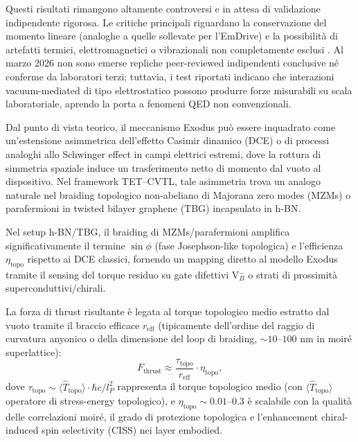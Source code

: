 \documentclass[11pt,a4paper]{article}
\let\oldcite\cite
\renewcommand{\cite}{\protect\oldcite}
\theoremstyle{plain}
\theoremstyle{definition}
\begin{document}
Questi risultati rimangono altamente controversi e in attesa di validazione indipendente rigorosa. Le critiche principali riguardano la conservazione del momento lineare (analoghe a quelle sollevate per l'EmDrive) e la possibilità di artefatti termici, elettromagnetici o vibrazionali non completamente esclusi \cite{Tajmar2021}. Al marzo 2026 non sono emerse repliche peer-reviewed indipendenti conclusive né conferme da laboratori terzi; tuttavia, i test riportati indicano che interazioni vacuum-mediated di tipo elettrostatico possono produrre forze misurabili su scala laboratoriale, aprendo la porta a fenomeni QED non convenzionali.


\vspace{0.4cm}

Dal punto di vista teorico, il meccanismo Exodus può essere inquadrato come un'estensione asimmetrica dell'effetto Casimir dinamico (DCE) o di processi analoghi allo Schwinger effect in campi elettrici estremi, dove la rottura di simmetria spaziale induce un trasferimento netto di momento dal vuoto al dispositivo. Nel framework TET--CVTL, tale asimmetria trova un analogo naturale nel braiding topologico non-abeliano di Majorana zero modes (MZMs) o parafermioni in twisted bilayer graphene (TBG) incapsulato in h-BN.

\vspace{0.3cm}

Nel setup h-BN/TBG, il braiding di MZMs/parafermioni amplifica significativamente il termine $\sin\phi$ (fase Josephson-like topologica) e l'efficienza $\eta_{\mathrm{topo}}$ rispetto ai DCE classici, fornendo un mapping diretto al modello Exodus tramite il sensing del torque residuo su gate difettivi V$_B^-$ o strati di prossimità superconduttivi/chirali.

La forza di thrust risultante è legata al torque topologico medio estratto dal vuoto tramite il braccio efficace $r_{\mathrm{eff}}$ (tipicamente dell'ordine del raggio di curvatura anyonico o della dimensione del loop di braiding, $\sim 10$--$100$ nm in moiré superlattice):
\begin{equation}
F_{\mathrm{thrust}} \approx \frac{\tau_{\mathrm{topo}}}{r_{\mathrm{eff}}} \cdot \eta_{\mathrm{topo}},
\label{eq:thrust}
\end{equation}
dove $\tau_{\mathrm{topo}} \sim \langle \hat{T}_{\mathrm{topo}} \rangle \cdot \hbar c / l_P^2$ rappresenta il torque topologico medio (con $\langle \hat{T}_{\mathrm{topo}} \rangle$ operatore di stress-energy topologico), e $\eta_{\mathrm{topo}} \sim 0.01$--$0.3$ è scalabile con la qualità delle correlazioni moiré, il grado di protezione topologica e l'enhancement chiral-induced spin selectivity (CISS) nei layer embodied.
\end{document}
